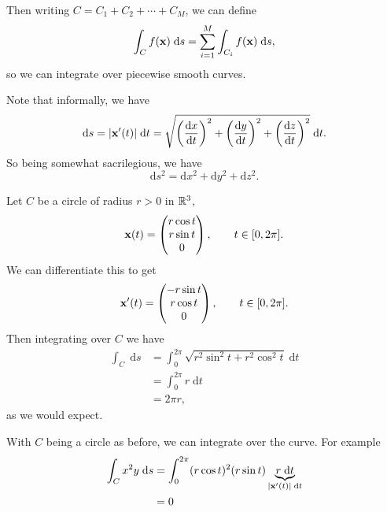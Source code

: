 \documentclass[a4paper]{scrreprt}
\begin{document}
\begin{center}

\end{center}

Then writing $C = C_1 + C_2 + \cdots + C_M$, we can define
$$
\int_C f(\mathbf{x}) \; \mathrm{d}s = \sum_{i = 1}^M \int_{C_i} f(\mathbf{x}) \; \mathrm{d}s,
$$
so we can integrate over piecewise smooth curves.

Note that informally, we have 
$$\mathrm{d}s = |\mathbf{x}'(t)| \; \mathrm{d}t = \sqrt{\left(\frac{\mathrm{d} x}{\mathrm{d} t}\right)^2 + \left(\frac{\mathrm{d} y}{\mathrm{d} t}\right)^2 + \left(\frac{\mathrm{d} z}{\mathrm{d} t}\right)^2} \; \mathrm{d}t.$$
So being somewhat sacrilegious, we have
$$
\mathrm{d}s^2 = \mathrm{d}x^2 + \mathrm{d}y^2 + \mathrm{d}z^2.
$$

\begin{example}
	Let $C$ be a circle of radius $r > 0$ in $\mathbb{R}^3$,
	$$
	\mathbf{x}(t) = \begin{pmatrix}
		r \cos t \\
		r \sin t \\
		0
	\end{pmatrix}, \quad \quad t \in [0, 2 \pi].
	$$
	We can differentiate this to get 
	$$
	\mathbf{x}'(t) = \begin{pmatrix}
		-r \sin t \\
		r \cos t \\
		0
	\end{pmatrix}, \quad \quad t \in [0, 2 \pi].
	$$
	Then integrating over $C$ we have
	\begin{align*}
		\int_C \; \mathrm{d}s &= \int_0^{2 \pi} \sqrt{r^2 \sin^2 t + r^2 \cos^2 t} \; \mathrm{d}t\\
		&= \int_0^{2 \pi} r \; \mathrm{d}t \\
		&= 2 \pi r,
	\end{align*}
	as we would expect.
\end{example}

\begin{example}
	With $C$ being a circle as before, we can integrate over the curve. For example
	\begin{align*}
		\int_C x^2 y \; \mathrm{d}s &= \int_0^{2 \pi} (r \cos t)^2 (r \sin t) \underbrace{r \; \mathrm{d}t}_{|\mathbf{x}'(t)| \; \mathrm{d}t} \\
		&= 0
	\end{align*}
\end{example}
\end{document}
